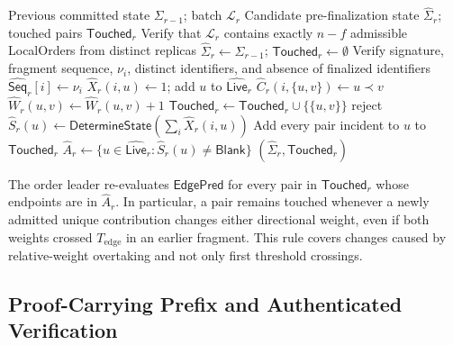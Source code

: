 \begin{algorithm}[t]
\caption{Authenticated Evidence-State Transition}
\label{alg:authenticated-state-transition}
\begin{algorithmic}[1]
\Require Previous committed state $\Sigma_{r-1}$; batch $\mathcal L_r$
\Ensure Candidate pre-finalization state $\widehat\Sigma_r$;
        touched pairs $\mathsf{Touched}_r$
\State Verify that $\mathcal L_r$ contains exactly $n-f$ admissible
       LocalOrders from distinct replicas
\State $\widehat\Sigma_r\gets\Sigma_{r-1}$;
       $\mathsf{Touched}_r\gets\emptyset$
  \State Verify signature, fragment sequence, $\nu_i$, distinct identifiers,
         and absence of finalized identifiers
  \State $\widehat{\mathsf{Seq}}_r[i]\gets\nu_i$
    \State $\widehat X_r(i,u)\gets1$;
           add $u$ to $\widehat{\mathsf{Live}}_r$
  \EndFor
      \State $\widehat C_r(i,\{u,v\})\gets u\prec v$
      \State $\widehat W_r(u,v)\gets\widehat W_r(u,v)+1$
      \State $\mathsf{Touched}_r\gets
             \mathsf{Touched}_r\cup\{\{u,v\}\}$
      \State \Return reject 
    \EndIf
  \EndFor
\EndFor
{}
  \State $\widehat S_r(u)\gets
         \mathsf{DetermineState}(\sum_i\widehat X_r(i,u))$
    \State Add every pair incident to $u$ to $\mathsf{Touched}_r$
  \EndIf
\EndFor
\State $\widehat A_r\gets
       \{u\in\widehat{\mathsf{Live}}_r:
       \widehat S_r(u)\ne\mathsf{Blank}\}$
\State \Return $(\widehat\Sigma_r,\mathsf{Touched}_r)$
\end{algorithmic}
\end{algorithm}

The order leader re-evaluates $\mathsf{EdgePred}$ for every pair in
$\mathsf{Touched}_r$ whose endpoints are in $\widehat A_r$. In particular, a
pair remains touched whenever a newly admitted unique contribution changes
either directional weight, even if both weights crossed
$T_{\mathrm{edge}}$ in an earlier fragment. This rule covers changes caused
by relative-weight overtaking and not only first threshold crossings.

\subsection{Proof-Carrying Prefix and Authenticated Verification}
\label{sec:authenticated-fragment-verification}


